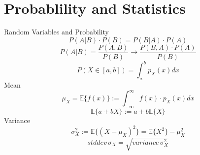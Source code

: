 \section*{Probablility and Statistics}
Random Variables and Probability
\begin{equation*}
P(A|B) \cdot  P(B) = P(B|A) \cdot  P(A)
\end{equation*}
\begin{equation*}
P(A|B) = \frac { P(A,B) }{ P(B) }  \rightarrow  \frac { P(B,A) \cdot  P(A) }{ P(B) } 
\end{equation*}
\begin{equation*}
P(X \in  [a,b]) = \int _{ a }^{ b }{  p_{ X }(x) dx } 
\end{equation*}
Mean
\begin{equation*}
\mu_X = \mathbb{ E }\{ f(x)\}  := \int _{ -\infty  }^{ \infty  }{  f(x) \cdot  p_{ X }(x) dx } 
\end{equation*}
\begin{equation*}
\mathbb{ E }\{ a + bX\}  := a + b\mathbb{ E }\{ X\} 
\end{equation*}
Variance
\begin{equation*}
\sigma _{ X }^{ 2 } := \mathbb{ E }\{ (X-\mu _{ X })^{ 2 }\}  = \mathbb{ E }\{ X^{ 2 }\} -\mu _{ X }^{ 2 }
\end{equation*}
\begin{equation*}
std dev \, \sigma _{ X } = \sqrt { variance \, \sigma _{ X }^{ 2 } } 
\end{equation*}
